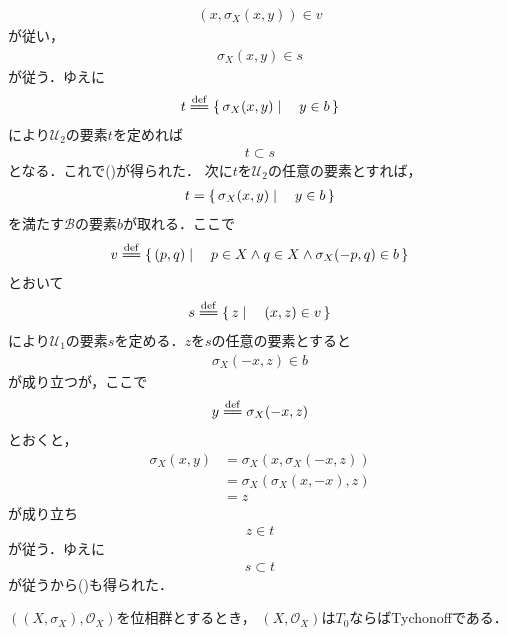 \begin{sketch}
\begin{align}
			\left(x,\sigma_X\left(x,y\right)\right) \in v
		\end{align}
		が従い，
		\begin{align}
			\sigma_X\left(x,y\right) \in s
		\end{align}
		が従う．ゆえに
		\begin{align}
			t \defeq \Set{\sigma_X(x,y)}{y \in b}
		\end{align}
		により$\mathscr{U}_2$の要素$t$を定めれば
		\begin{align}
			t \subset s
		\end{align}
		となる．これで()が得られた．
		次に$t$を$\mathscr{U}_2$の任意の要素とすれば，
		\begin{align}
			t = \left\{\, \sigma_X(x,y) \mid \quad y \in b\, \right\}
		\end{align}
		を満たす$\mathscr{B}$の要素$b$が取れる．ここで
		\begin{align}
			v \defeq \Set{(p,q)}{p \in X \wedge q \in X \wedge \sigma_X(-p,q) \in b}
		\end{align}
		とおいて
		\begin{align}
			s \defeq \Set{z}{(x,z) \in v}
		\end{align}
		により$\mathscr{U}_1$の要素$s$を定める．$z$を$s$の任意の要素とすると
		\begin{align}
			\sigma_X(-x,z) \in b
		\end{align}
		が成り立つが，ここで
		\begin{align}
			y \defeq \sigma_X(-x,z)
		\end{align}
		とおくと，
		\begin{align}
			\sigma_X(x,y) &= \sigma_X\left(x,\sigma_X\left(-x,z\right)\right) \\
			&= \sigma_X\left(\sigma_X\left(x,-x\right),z\right) \\
			&= z
		\end{align}
		が成り立ち
		\begin{align}
			z \in t
		\end{align}
		が従う．ゆえに
		\begin{align}
			s \subset t
		\end{align}
		が従うから()も得られた．
		\QED
	\end{sketch}
	
	\begin{screen}
		\begin{thm}
			$\left(\left(X,\sigma_X\right),\mathscr{O}_X\right)$を位相群とするとき，
			$\left(X,\mathscr{O}_X\right)$は$T_0$ならばTychonoffである．
		\end{thm}
	\end{screen}
	
